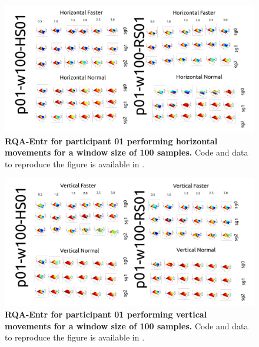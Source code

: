 \documentclass[12pt]{article}
\begin{document}
\newpage
\begin{figure}[ht!]
\centering
\includegraphics[scale=1.0]{sm-fig01}
    	\caption{
	{\bf RQA-Entr for participant 01 performing horizontal movements for a window size of 100 samples.}
	Code and data to reproduce the figure is available in \cite{srep2021}.
        }
    \label{fig-p01-H-w100}
\end{figure}
\begin{figure}[hb!]
\centering
\includegraphics[scale=1.0]{sm-fig02}
    	\caption{
	{\bf RQA-Entr for participant 01 performing vertical movements for a window size of 100 samples.}
	Code and data to reproduce the figure is available in \cite{srep2021}.
        }
    \label{fig-p01-V-w100}
\end{figure}
\end{document}
